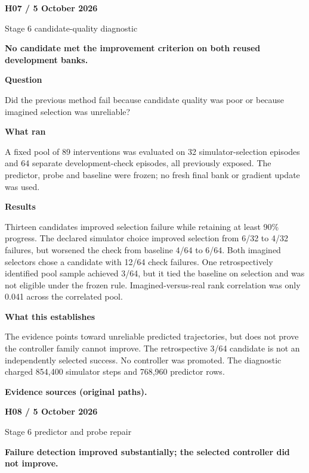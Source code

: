 \documentclass[11pt,a4paper]{article}
\newcommand{\block}[2]{\par\textbf{\color{ink}#1}\par\nopagebreak #2\par}
\newcommand{\finding}[1]{\begin{tcolorbox}[colback=pale,colframe=pale,boxrule=0pt,arc=1mm,left=10pt,right=10pt,top=10pt,bottom=10pt]\color{ink}\large\bfseries #1\end{tcolorbox}}
\begin{document}
\clearpage
{}\label{exp:H07}
{\color{accent}\small\bfseries H07 / 5 October 2026}\par
{}\par
{\color{muted}\small Stage 6 candidate-quality diagnostic}\par\vspace{2mm}
\finding{No candidate met the improvement criterion on both reused development banks.}
\block{Question}{Did the previous method fail because candidate quality was poor or because imagined selection was unreliable?}
\block{What ran}{A fixed pool of 89 interventions was evaluated on 32 simulator-selection episodes and 64 separate development-check episodes, all previously exposed. The predictor, probe and baseline were frozen; no fresh final bank or gradient update was used.}
\block{Results}{Thirteen candidates improved selection failure while retaining at least 90\% progress. The declared simulator choice improved selection from 6/32 to 4/32 failures, but worsened the check from baseline 4/64 to 6/64. Both imagined selectors chose a candidate with 12/64 check failures. One retrospectively identified pool sample achieved 3/64, but it tied the baseline on selection and was not eligible under the frozen rule. Imagined-versus-real rank correlation was only 0.041 across the correlated pool.}
\block{What this establishes}{The evidence points toward unreliable predicted trajectories, but does not prove the controller family cannot improve. The retrospective 3/64 candidate is not an independently selected success. No controller was promoted. The diagnostic charged 854,400 simulator steps and 768,960 predictor rows.}
\vfill{\footnotesize\color{muted}\textbf{Evidence sources (original paths).}\par
\raggedright {}}
\clearpage
{}\label{exp:H08}
{\color{accent}\small\bfseries H08 / 5 October 2026}\par
{}\par
{\color{muted}\small Stage 6 predictor and probe repair}\par\vspace{2mm}
\finding{Failure detection improved substantially; the selected controller did not improve.}
\end{document}
